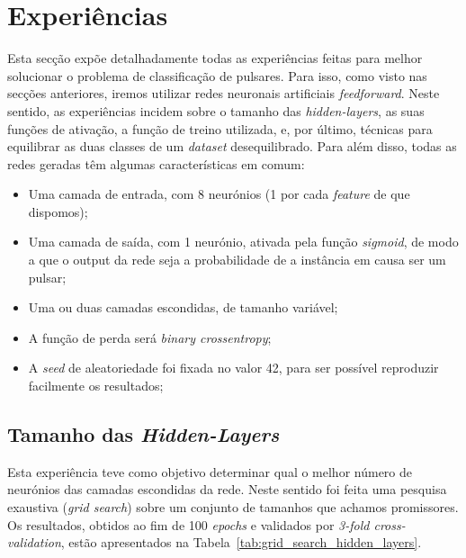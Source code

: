 \documentclass[]{article}
\begin{document}
\section{Experiências}
\label{sec:experiencias}
Esta secção expõe detalhadamente todas as experiências feitas para melhor solucionar o problema de classificação de pulsares. Para isso, como visto nas secções anteriores, iremos utilizar redes neuronais artificiais \textit{feedforward}. Neste sentido, as experiências incidem sobre o tamanho das \textit{hidden-layers}, as suas funções de ativação, a função de treino utilizada, e, por último, técnicas para equilibrar as duas classes de um \textit{dataset} desequilibrado. Para além disso, todas as redes geradas têm algumas características em comum:
\begin{itemize}
\item Uma camada de entrada, com 8 neurónios (1 por cada \textit{feature} de que dispomos);
\item Uma camada de saída, com 1 neurónio, ativada pela função \textit{sigmoid}, de modo a que o output da rede seja a probabilidade de a instância em causa ser um pulsar;
\item Uma ou duas camadas escondidas, de tamanho variável;
\item A função de perda será \textit{binary crossentropy};
\item A \textit{seed} de aleatoriedade foi fixada no valor 42, para ser possível reproduzir facilmente os resultados;
\end{itemize}


\subsection{Tamanho das \textit{Hidden-Layers}}
\label{sec:tamanho_das_layers}
Esta experiência teve como objetivo determinar qual o melhor número de neurónios das camadas escondidas da rede. Neste sentido foi feita uma pesquisa exaustiva (\textit{grid search}) sobre um conjunto de tamanhos que achamos promissores. Os resultados, obtidos ao fim de 100 \textit{epochs} e validados por \textit{3-fold cross-validation}, estão apresentados na Tabela~\ref{tab:grid_search_hidden_layers}.
\end{document}
